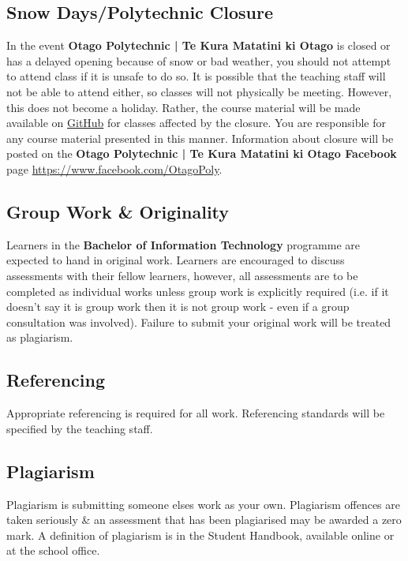 \documentclass{article}
\begin{document}
\subsection*{Snow Days/Polytechnic Closure}
In the event \textbf{Otago Polytechnic | Te Kura Matatini ki Otago} is closed or has a delayed opening because of snow or bad weather, you should not attempt to attend class if it is unsafe to do so. It is possible that the teaching staff will not be able to attend either, so classes will not physically be meeting. However, this does not become a holiday. Rather, the course material will be made available on \href{https://github.com/otago-polytechnic-bit-courses/ID721001-mobile-application-development}{GitHub} for classes affected by the closure. You are responsible for any course material presented in this manner. Information about closure will be posted on the \textbf{Otago Polytechnic | Te Kura Matatini ki Otago Facebook} page \href{https://www.facebook.com/OtagoPoly}{https://www.facebook.com/OtagoPoly}.

\subsection*{Group Work \& Originality}
Learners in the \textbf{Bachelor of Information Technology} programme are expected to hand in original work. Learners are encouraged to discuss assessments with their fellow learners, however, all assessments are to be completed as individual works unless group work is explicitly required (i.e. if it doesn't say it is group work then it is not group work - even if a group consultation was involved). Failure to submit your original work will be treated as plagiarism.

\subsection*{Referencing}
Appropriate referencing is required for all work. Referencing standards will be specified by the teaching staff.

\subsection*{Plagiarism}
Plagiarism is submitting someone elses work as your own. Plagiarism offences are taken seriously \& an assessment that has been plagiarised may be awarded a zero mark. A definition of plagiarism is in the Student Handbook, available online or at the school office.
\end{document}
